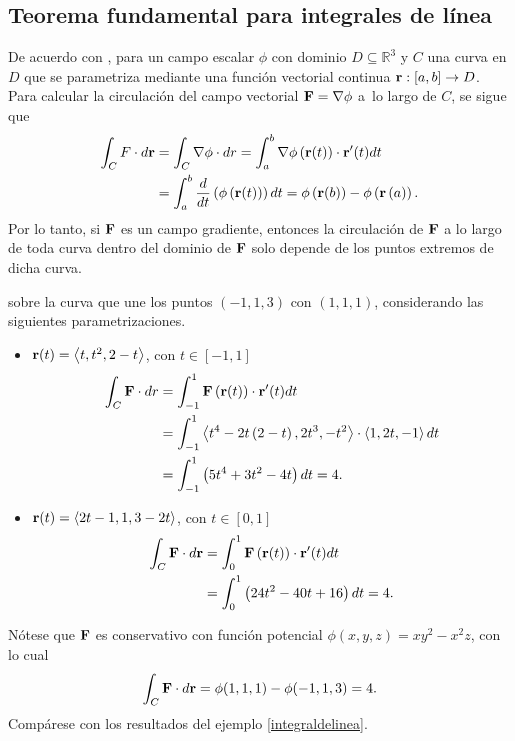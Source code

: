 \subsection{Teorema fundamental para integrales de línea}
De acuerdo con \cite{acosta_gempeler_doce_2020},
para un campo escalar $\phi$ con dominio $D \subseteq \mathbb{R}^3$ y $C$ una curva en
$D$ que se parametriza mediante una función vectorial continua ${\bf r} : [a, b]\to D$. Para calcular la circulación del campo vectorial ${\bf F}=\nabla \phi$ a~lo largo de $C$, se sigue que
\begin{align*}
\int_{C}F\cdot d{\bf r}&=\int_{C}\nabla\phi\cdot dr=\int_{a}^{b}\nabla \phi\left({\bf r}(t)\right)\cdot {\bf r}^{\prime}(t) dt\\
&= \int_{a}^{b} \frac{d}{dt} \left(\phi \left({\bf r}(t)\right) \right) dt= \phi \left({\bf r}(b)\right) -\phi\left({\bf r}\left( a\right) \right).
\end{align*}
Por lo tanto, si ${\bf F}$ es un campo gradiente, entonces la circulación de ${\bf F}$ a lo largo de toda curva dentro del dominio de ${\bf F}$ solo depende de los puntos extremos de dicha curva.

\clearpage

\begin{ejemplo}
 sobre la curva que une los puntos $\left( -1,1,3\right) $ con $\left( 1,1,1\right)$, considerando las siguientes parametrizaciones.

\begin{itemize}
  \item ${\bf r}(t) =\left\langle t,t^{2},2-t\right\rangle $, con $t\in [-1,1]$
    \begin{align*}
      \int_{C}{\bf F}\cdot dr &= \int_{-1}^{1}{\bf F}\left({\bf r}(t) \right) \cdot {\bf r}^{\prime }(t) dt\\
      &= \int_{-1}^{1}\left\langle t^{4}-2t\left( 2-t\right) ,2t^{3},-t^{2}\right\rangle \cdot \left\langle 1,2t,-1\right\rangle dt \\
      &= \int_{-1}^{1}\left(5t^{4}+3t^{2}-4t\right) dt= 4.
    \end{align*}

  \item ${\bf r}(t) =\left\langle 2t-1,1,3-2t\right\rangle $, con $t\in [0,1]$
    \begin{align*}
      \int_{C}{\bf F}\cdot d{\bf r}&=\int_{0}^{1}{\bf F}\left({\bf r}(t) \right) \cdot{\bf r}^{\prime }(t) dt \\
      &= \int_{0}^{1}\left( 24t^{2}-40t+16\right)dt= 4.
    \end{align*}
\end{itemize}

Nótese que ${\bf F}$ es conservativo con función potencial $\phi(x,y,z)=xy^2-x^2z$, con lo cual
\[\int_{C}{\bf F}\cdot d{\bf r}= \phi(1,1,1)-\phi(-1,1,3)=4.\]
Compárese con los resultados del ejemplo \ref{integraldelinea}.
\end{ejemplo}

